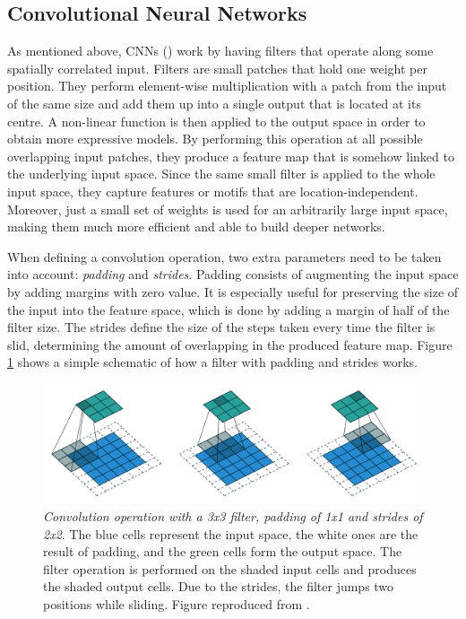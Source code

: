 \subsection{Convolutional Neural Networks} \label{sect:cnn}
As mentioned above, CNNs (\cite{LeCun1998}) work by having filters that operate along some spatially correlated input. Filters are small patches that hold one weight per position. They perform element-wise multiplication with a patch from the input of the same size and add them up into a single output that is located at its centre. A non-linear function is then applied to the output space in order to obtain more expressive models. By performing this operation at all possible overlapping input patches, they produce a feature map that is somehow linked to the underlying input space. Since the same small filter is applied to the whole input space, they capture features or motifs that are location-independent. Moreover, just a small set of weights is used for an arbitrarily large input space, making them much more efficient and able to build deeper networks.

When defining a convolution operation, two extra parameters need to be taken into account: \textit{padding} and \textit{strides}. Padding consists of augmenting the input space by adding margins with zero value. It is especially useful for preserving the size of the input into the feature space, which is done by adding a margin of half of the filter size. The strides define the size of the steps taken every time the filter is slid, determining the amount of overlapping in the produced feature map. Figure \ref{fig:padding} shows a simple schematic of how a filter with padding and strides works.

\begin{figure}
	\centering
	\includegraphics[width=0.8\linewidth]{Figures/padding}
	\caption{\textit{Convolution operation with a 3x3 filter, padding of 1x1 and strides of 2x2}. The blue cells represent the input space, the white ones are the result of padding, and the green cells form the output space. The filter operation is performed on the shaded input cells and produces the shaded output cells. Due to the strides, the filter jumps two positions while sliding. Figure reproduced from \cite{Dumoulin2016}.}
	\label{fig:padding}
\end{figure}

